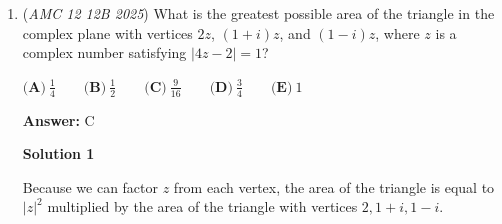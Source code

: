 \begin{enumerate}
 $\quad\bullet$ \(144\cos\alpha = 144\) yields third side lengths of \(\sqrt{145-144}=1\) and \(\sqrt{145+144}=17\)

 $\quad\bullet$ \(144\cos\alpha = 24\) yields third side lengths of \(\sqrt{145-24}=11\) and \(\sqrt{145+24}=13\)

 However, 1 and 17 do not work because they violate the triangle inequality, forming degenerate triangles (\(8+1=9\) and \(8+9=17\)). Thus, 13 and 11 are the only possible two valid side lengths. We arrive at an answer of \(11+13=\boxed{\textbf{(C)}\ 24}\).

 (*) This preserves the base of 9 and the height of \(8\sin\alpha\), ensuring the area remains identical! Man, what can I say? Mamba out. When I see you again.

 


 



\textbf{Solution 7 (<30 sec)}

Let us call our missing sides $x$ and $y$. By median length formula, we get $2(8^2) = x^2 + y^2 - 2(9^2)$, which gives us $x^2 + y^2 = 290$. Since these are both integers, we plug in reasonable numbers, where we see $(x, y) = (11, 13)$. Thus, our sum is $11 + 13 = \boxed{24}$




\textbf{Solution 8 (5 seconds Cheese)}

Let us assume that the two triangles are congruent, and that the angle between the two sides $8$ and $9$ in both triangles is $90^\circ$. Through the Pythagorean Theorem, we find the hypotenuse equal to $\sqrt{8^2+9^2}=\sqrt{145}$. Since the sum must be equal to $2\sqrt{145}$ to which the closest answer choice is $\boxed{\textbf{(C)}\ 24}$.

 


 


	\item (\textit{AMC 12 12B 2025}) What is the greatest possible area of the triangle in the complex plane with vertices $2z$, $(1+i)z$, and $(1-i)z$, where $z$ is a complex number satisfying $|4z - 2| = 1$?


 $\textbf{(A)}~\frac 14 \qquad \textbf{(B)}~\frac 12 \qquad \textbf{(C)}~\frac{9}{16} \qquad \textbf{(D)}~\frac 34 \qquad \textbf{(E)}~1$

 \textbf{Answer: }C



\textbf{Solution 1}

Because we can factor $z$ from each vertex, the area of the triangle is equal to $|z|^2$ multiplied by the area of the triangle with vertices $2, 1+i, 1-i$. 


\end{enumerate}

